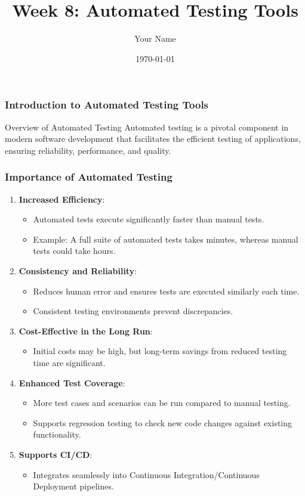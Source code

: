 \documentclass{beamer}
\title{Week 8: Automated Testing Tools}
\author{Your Name}
\institute{Your Institution}
\date{\today}
\begin{document}
\frame{\titlepage}

\begin{frame}[fragile]
    \frametitle{Introduction to Automated Testing Tools}
    \begin{block}{Overview of Automated Testing}
        Automated testing is a pivotal component in modern software development that facilitates 
        the efficient testing of applications, ensuring reliability, performance, and quality.
    \end{block}
\end{frame}

\begin{frame}[fragile]
    \frametitle{Importance of Automated Testing}
    \begin{enumerate}
        \item \textbf{Increased Efficiency}: 
        \begin{itemize}
            \item Automated tests execute significantly faster than manual tests.
            \item Example: A full suite of automated tests takes minutes, whereas manual tests could take hours.
        \end{itemize}
        
        \item \textbf{Consistency and Reliability}: 
        \begin{itemize}
            \item Reduces human error and ensures tests are executed similarly each time.
            \item Consistent testing environments prevent discrepancies.
        \end{itemize}
        
        \item \textbf{Cost-Effective in the Long Run}:
        \begin{itemize}
            \item Initial costs may be high, but long-term savings from reduced testing time are significant.
        \end{itemize}
        
        \item \textbf{Enhanced Test Coverage}: 
        \begin{itemize}
            \item More test cases and scenarios can be run compared to manual testing.
            \item Supports regression testing to check new code changes against existing functionality.
        \end{itemize}
        
        \item \textbf{Supports CI/CD}: 
        \begin{itemize}
            \item Integrates seamlessly into Continuous Integration/Continuous Deployment pipelines.
        \end{itemize}
    \end{enumerate}
\end{frame}
\end{document}
